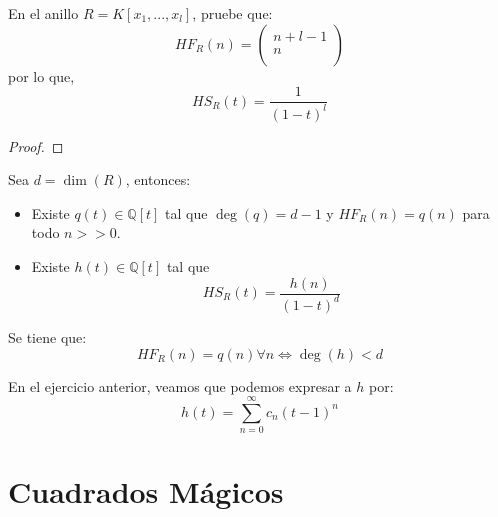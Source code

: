 \documentclass[12pt]{report}
\newcounter{it}
\theoremstyle{largebreak}
\begin{document}
    \begin{excer}
        En el anillo $R=K[x_1,...,x_l]$, pruebe que:
        \begin{equation*}
            HF_R(n)=\left(\begin{array}{c}
                n+l-1\\
                n\\
            \end{array} \right)
        \end{equation*}
        por lo que,
        \begin{equation*}
            HS_R(t)=\frac{1}{(1-t)^l}
        \end{equation*}
    \end{excer}

    \begin{proof}
        
    \end{proof}

    \begin{theor}
        Sea $d=\dim(R)$, entonces:
        \begin{itemize}
            \item Existe $q(t)\in\mathbb{Q}[t]$ tal que $\deg(q)=d-1$ y $HF_R(n)=q(n)$ para todo $n>>0$.
            \item Existe $h(t)\in\mathbb{Q}[t]$ tal que
            \begin{equation*}
                HS_R(t)=\frac{h(n)}{(1-t)^d}
            \end{equation*}
        \end{itemize}
    \end{theor}

    \begin{excer}
        Se tiene que:
        \begin{equation*}
            HF_R(n)=q(n)\forall n\iff \deg(h)<d
        \end{equation*}
    \end{excer}

    \begin{obs}
        En el ejercicio anterior, veamos que podemos expresar a $h$ por:
        \begin{equation*}
            h(t)=\sum_{ n=0}^\infty c_n(t-1)^n
        \end{equation*}
    \end{obs}

    \section{Cuadrados Mágicos}
\end{document}
